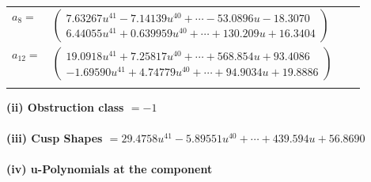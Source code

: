 \documentclass[1p]{elsarticle_modified}
\theoremstyle{definition}
\begin{document}
\begin{tabular}{m{7pt} m{180pt} m{7pt} m{180pt} }
\flushright $a_{8}=$&$\begin{pmatrix}7.63267 u^{41}-7.14139 u^{40}+\cdots-53.0896 u-18.3070\\6.44055 u^{41}+0.639959 u^{40}+\cdots+130.209 u+16.3404\end{pmatrix}$ \\
\flushright $a_{12}=$&$\begin{pmatrix}19.0918 u^{41}+7.25817 u^{40}+\cdots+568.854 u+93.4086\\-1.69590 u^{41}+4.74779 u^{40}+\cdots+94.9034 u+19.8886\end{pmatrix}$\\&\end{tabular}
\flushleft \textbf{(ii) Obstruction class $= -1$}\\~\\
\flushleft \textbf{(iii) Cusp Shapes $= 29.4758 u^{41}-5.89551 u^{40}+\cdots+439.594 u+56.8690$}\\~\\
\newpage\renewcommand{\arraystretch}{1}
\flushleft \textbf{(iv) u-Polynomials at the component}\newline \\
\end{document}
